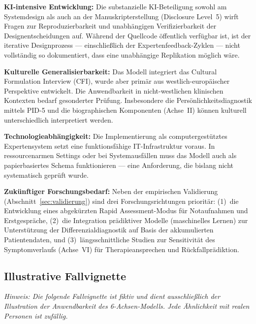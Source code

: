 \documentclass[11pt,a4paper]{article}
\begin{document}
\textbf{KI-intensive Entwicklung:} Die substanzielle KI-Beteiligung sowohl am Systemdesign als auch an der Manuskripterstellung (Disclosure Level~5) wirft Fragen zur Reproduzierbarkeit und unabh\"angigen Verifizierbarkeit der Designentscheidungen auf. W\"ahrend der Quellcode \"offentlich verf\"ugbar ist, ist der iterative Designprozess --- einschlie\ss{}lich der Expertenfeedback-Zyklen --- nicht vollst\"andig so dokumentiert, dass eine unabh\"angige Replikation m\"oglich w\"are.

\textbf{Kulturelle Generalisierbarkeit:} Das Modell integriert das Cultural Formulation Interview (CFI), wurde aber prim\"ar aus westlich-europ\"aischer Perspektive entwickelt. Die Anwendbarkeit in nicht-westlichen klinischen Kontexten bedarf gesonderter Pr\"ufung. Insbesondere die Pers\"onlichkeitsdiagnostik mittels PID-5 und die biographischen Komponenten (Achse~II) k\"onnen kulturell unterschiedlich interpretiert werden.

\textbf{Technologieabh\"angigkeit:} Die Implementierung als computergest\"utztes Expertensystem setzt eine funktionsf\"ahige IT-Infrastruktur voraus. In ressourcenarmen Settings oder bei Systemausf\"allen muss das Modell auch als papierbasiertes Schema funktionieren --- eine Anforderung, die bislang nicht systematisch gepr\"uft wurde.

\textbf{Zuk\"unftiger Forschungsbedarf:} Neben der empirischen Validierung (Abschnitt~\ref{sec:validierung}) sind drei Forschungsrichtungen priorit\"ar: (1)~die Entwicklung eines abgek\"urzten \glqq Rapid Assessment\grqq{}-Modus f\"ur Notaufnahmen und Erstgespräche, (2)~die Integration pr\"adiktiver Modelle (maschinelles Lernen) zur Unterst\"utzung der Differenzialdiagnostik auf Basis der akkumulierten Patientendaten, und (3)~l\"angsschnittliche Studien zur Sensitivit\"at des Symptomverlaufs (Achse~VI) f\"ur Therapieansprechen und R\"uckfallpr\"adiktion.


\subsection{Illustrative Fallvignette}
\label{sec:fallvignette}

\textit{Hinweis: Die folgende Fallvignette ist fiktiv und dient ausschlie\ss{}lich der Illustration der Anwendbarkeit des 6-Achsen-Modells. Jede \"Ahnlichkeit mit realen Personen ist zuf\"allig.}
\end{document}

